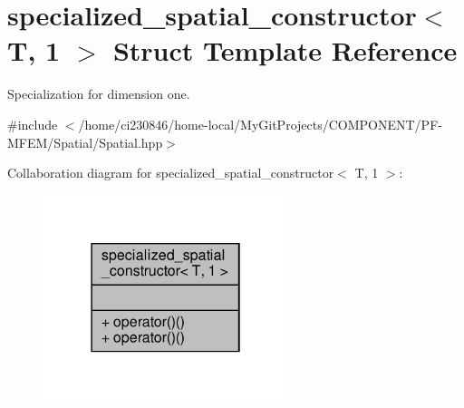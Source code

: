 \hypertarget{structspecialized__spatial__constructor_3_01T_00_011_01_4}{}\section{specialized\+\_\+spatial\+\_\+constructor$<$ T, 1 $>$ Struct Template Reference}
\label{structspecialized__spatial__constructor_3_01T_00_011_01_4}


Specialization for dimension one.  




{\ttfamily \#include $<$/home/ci230846/home-\/local/\+My\+Git\+Projects/\+C\+O\+M\+P\+O\+N\+E\+N\+T/\+P\+F-\/\+M\+F\+E\+M/\+Spatial/\+Spatial.\+hpp$>$}



Collaboration diagram for specialized\+\_\+spatial\+\_\+constructor$<$ T, 1 $>$\+:\nopagebreak
\begin{figure}[H]
\begin{center}
\leavevmode
\includegraphics[width=202pt]{structspecialized__spatial__constructor_3_01T_00_011_01_4__coll__graph}
\end{center}
\end{figure}
